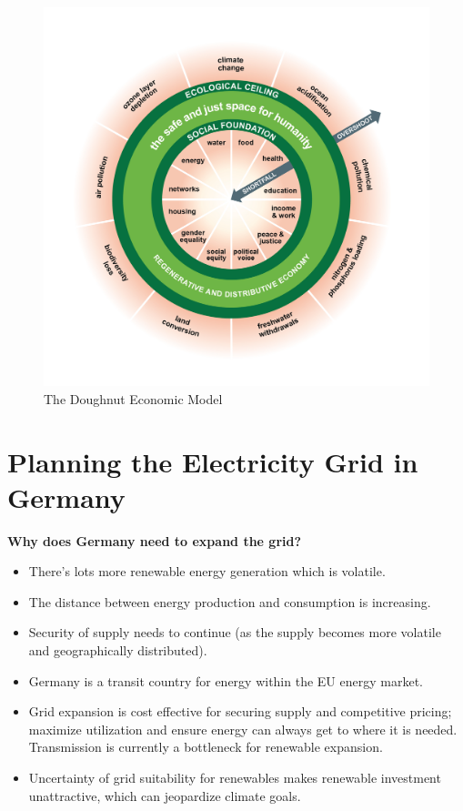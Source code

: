 \begin{figure}[H]
 \centering
 \includegraphics[width=0.6\columnwidth]{doughnut_economic_model.jpg}
 \caption{The Doughnut Economic Model}
\end{figure}

\section{Planning the Electricity Grid in Germany}

\textbf{Why does Germany need to expand the grid?}
\begin{itemize}
  \item There's lots more renewable energy generation which is
    volatile.
  \item The distance between energy production and consumption is
    increasing.
  \item Security of supply needs to continue (as the supply becomes
    more volatile and geographically distributed).
  \item Germany is a transit country for energy within the EU energy
    market.
  \item Grid expansion is cost effective for securing supply and
    competitive pricing; maximize utilization and ensure energy can
    always get to where it is needed. Transmission is currently a
    bottleneck for renewable expansion.
  \item Uncertainty of grid suitability for renewables makes renewable
    investment unattractive, which can jeopardize climate goals.
\end{itemize}

